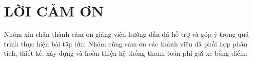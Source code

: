 \chapter*{LỜI CẢM ƠN}
Nhóm xin chân thành cảm ơn giảng viên hướng dẫn đã hỗ trợ và góp ý trong quá trình thực hiện bài tập lớn. Nhóm cũng cảm ơn các thành viên đã phối hợp phân tích, thiết kế, xây dựng và hoàn thiện hệ thống thanh toán phí gửi xe bằng điểm.
